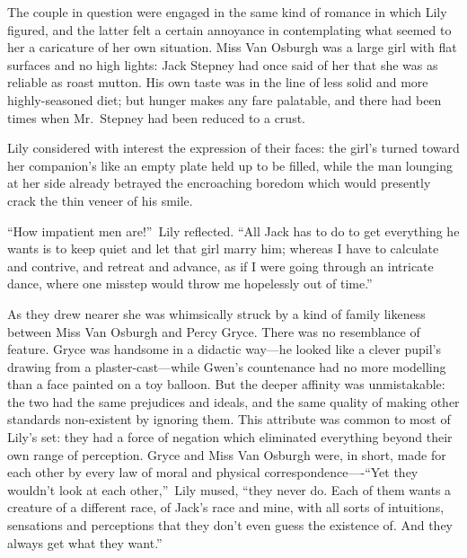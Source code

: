 \documentclass[12pt,a4paper]{book}
\begin{document}
The couple in question were engaged in the same kind of romance
in which Lily figured, and the latter felt a certain annoyance in
contemplating what seemed to her a caricature of her own
situation. Miss Van Osburgh was a large girl with flat surfaces
and no high lights: Jack Stepney had once said of her that she
was as reliable as roast mutton. His own taste was in the line of
less solid and more highly-seasoned diet; but hunger makes any
fare palatable, and there had been times when Mr.\ Stepney had
been reduced to a crust.





Lily considered with interest the expression of their faces: the
girl's turned toward her companion's like an empty plate held up
to be filled, while the man lounging at her side already betrayed
the encroaching boredom which would presently crack the thin
veneer of his smile.





``How impatient men are!''\ Lily reflected. ``All Jack has to do to
get everything he wants is to keep quiet and let that girl marry
him; whereas I have to calculate and contrive, and retreat and
advance, as if I were going through an intricate dance,
where one misstep would throw me hopelessly out of time.''





As they drew nearer she was whimsically struck by a kind of
family likeness between Miss Van Osburgh and Percy Gryce. There
was no resemblance of feature. Gryce was handsome in a didactic
way---he looked like a clever pupil's drawing from a
plaster-cast---while Gwen's countenance had no more modelling than
a face painted on a toy balloon. But the deeper affinity was
unmistakable: the two had the same prejudices and ideals, and the
same quality of making other standards non-existent by ignoring
them. This attribute was common to most of Lily's set: they had a
force of negation which eliminated everything beyond their own
range of perception. Gryce and Miss Van Osburgh were, in short,
made for each other by every law of moral and physical
correspondence----``Yet they wouldn't look at each other,''\ Lily
mused, ``they never do. Each of them wants a creature of a
different race, of Jack's race and mine, with all sorts of
intuitions, sensations and perceptions that they don't even guess
the existence of. And they always get what they want.''
\end{document}
